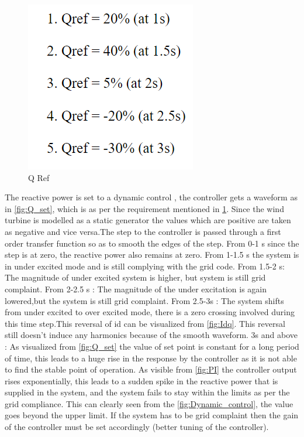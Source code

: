 \begin{figure}[H]
    \centering
        \includegraphics[width=0.2 \linewidth]{images_a7/Qref_setpoints.PNG}
        \caption{Q Ref}
        \label{fig:Q_ref}   
\end{figure}
The reactive power is set to a dynamic control , the controller gets a waveform as in \ref{fig:Q_set}, which is as per the requirement mentioned in \ref{fig:Q_ref}. Since the wind turbine is modelled as a static generator the values which are positive are taken as negative and vice versa.The step to the controller is passed through a first order transfer function so as to smooth the edges of the step.
From 0-1 s since the step is at zero, the reactive power also remains at zero.
From 1-1.5 s the system is in under excited mode and is still complying with the grid code.
From 1.5-2 s: The magnitude of under excited system is higher, but system is still grid complaint. 
From 2-2.5 s : The magnitude of the under excitation is again lowered,but the system is still  grid complaint.
From 2.5-3s : The system shifts from under excited to over excited mode, there is a zero crossing involved during this time step.This reversal of id can be visualized from \ref{fig:Idq}. This reversal still doesn't induce any harmonics because of the smooth waveform.
3s and above : As visualized from \ref{fig:Q_set} the value of set point is constant for a long period of time, this leads to a huge rise in the response by the controller as it is not able to find the stable point of operation. As visible from 
\ref{fig:PI} the controller output rises exponentially, this leads to a sudden spike in the reactive power that is supplied in the system, and the system fails to stay within the limits as per the grid compliance. This can clearly seen from the 
\ref{fig:Dynamic_control}, the value goes beyond the upper limit. 
If the system has to be grid complaint then the gain of the controller must be set accordingly (better tuning of the controller).

